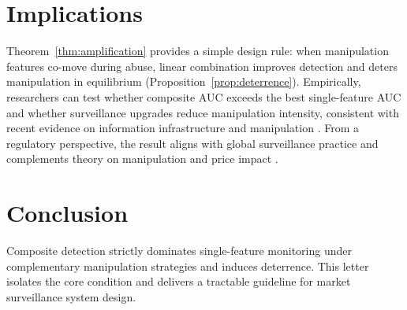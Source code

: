 \documentclass[preprint,12pt,authoryear]{elsarticle}
\begin{document}
\section{Implications}
Theorem~\ref{thm:amplification} provides a simple design rule: when manipulation features co-move during abuse, linear combination improves detection and deters manipulation in equilibrium (Proposition~\ref{prop:deterrence}). Empirically, researchers can test whether composite AUC exceeds the best single-feature AUC and whether surveillance upgrades reduce manipulation intensity, consistent with recent evidence on information infrastructure and manipulation \citep{liu2024asset,xiong2024information,wang2024information}. From a regulatory perspective, the result aligns with global surveillance practice \citep{cumming2008global} and complements theory on manipulation and price impact \citep{huberman2004price}.

\section{Conclusion}
Composite detection strictly dominates single-feature monitoring under complementary manipulation strategies and induces deterrence. This letter isolates the core condition and delivers a tractable guideline for market surveillance system design.



\end{document}
